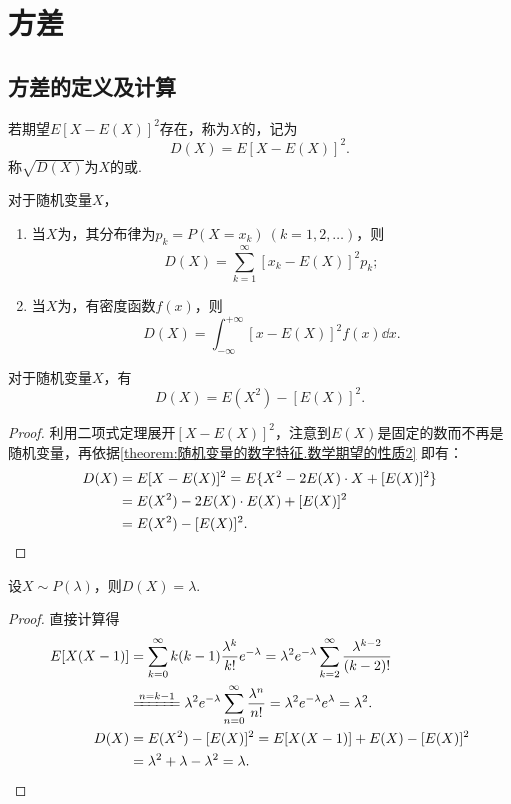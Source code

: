 \section{方差}
\subsection{方差的定义及计算}
\begin{definition}
若期望\(E[X-E(X)]^2\)存在，称为\(X\)的，记为\[
D(X) = E[X-E(X)]^2.
\]称\(\sqrt{D(X)}\)为\(X\)的或.
\end{definition}

\begin{theorem}
对于随机变量\(X\)，
\begin{enumerate}
\item 当\(X\)为，其分布律为\(p_k = P(X=x_k)\ (k=1,2,\dotsc)\)，则\[
D(X) = \sum\limits_{k=1}^\infty [x_k - E(X)]^2 p_k;
\]
\item 当\(X\)为，有密度函数\(f(x)\)，则\[
D(X) = \int_{-\infty}^{+\infty} [x - E(X)]^2 f(x) \dd{x}.
\]
\end{enumerate}
\end{theorem}

\begin{corollary}\label{theorem:随机变量的数字特征.常用的方差的计算式}
对于随机变量\(X\)，有\begin{equation}
D(X) = E(X^2) - [E(X)]^2.
\end{equation}
\begin{proof}
利用二项式定理展开\([X-E(X)]^2\)，注意到\(E(X)\)是固定的数而不再是随机变量，再依据\cref{theorem:随机变量的数字特征.数学期望的性质2} 即有：
\begin{align*}
D(X) &= E[X-E(X)]^2
= E\{X^2 - 2E(X) \cdot X + [E(X)]^2\} \\
&= E(X^2) - 2E(X) \cdot E(X) + [E(X)]^2 \\
&= E(X^2) - [E(X)]^2.
\qedhere
\end{align*}
\end{proof}
\end{corollary}

\begin{theorem}
设\(X \sim P(\lambda)\)，则\(D(X) = \lambda\).
\begin{proof}
直接计算得
\begin{align*}
E[X(X-1)]
&= \sum\limits_{k=0}^\infty {k(k-1) \frac{\lambda^k}{k!} e^{-\lambda}}
= \lambda^2 e^{-\lambda} \sum\limits_{k=2}^\infty {\frac{\lambda^{k-2}}{(k-2)!}} \\
&\xlongequal{n=k-1} \lambda^2 e^{-\lambda} \sum\limits_{n=0}^\infty {\frac{\lambda^n}{n!}}
= \lambda^2 e^{-\lambda} e^{\lambda} = \lambda^2. \\
D(X)
&= E(X^2) - [E(X)]^2
= E[X(X-1)] + E(X) - [E(X)]^2 \\
&= \lambda^2 + \lambda - \lambda^2 = \lambda.
\qedhere
\end{align*}
\end{proof}
\end{theorem}

